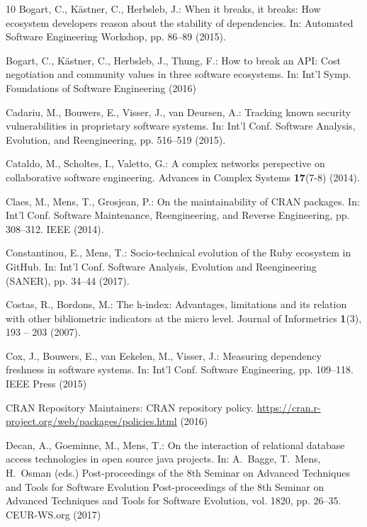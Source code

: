 \documentclass[smallextended]{svjour3}       %
\begin{document}
\begin{thebibliography}{10}
Bogart, C., {K\"astner}, C., Herbsleb, J.: When it breaks, it breaks: How
  ecosystem developers reason about the stability of dependencies.
\newblock In: Automated Software Engineering Workshop, pp. 86--89 (2015).
\newblock {}

Bogart, C., K\"astner, C., Herbsleb, J., Thung, F.: How to break an {API}: Cost
  negotiation and community values in three software ecosystems.
\newblock In: Int'l Symp. Foundations of Software Engineering (2016)

Cadariu, M., Bouwers, E., Visser, J., van Deursen, A.: Tracking known security
  vulnerabilities in proprietary software systems.
\newblock In: Int'l Conf. Software Analysis, Evolution, and Reengineering, pp.
  516--519 (2015).
\newblock {}

Cataldo, M., Scholtes, I., Valetto, G.: A complex networks perspective on
  collaborative software engineering.
\newblock Advances in Complex Systems \textbf{17}(7-8) (2014).
\newblock {}

Claes, M., Mens, T., Grosjean, P.: On the maintainability of {CRAN} packages.
\newblock In: Int'l Conf. Software Maintenance, Reengineering, and Reverse
  Engineering, pp. 308--312. {IEEE} (2014).
\newblock {}

Constantinou, E., Mens, T.: Socio-technical evolution of the {Ruby} ecosystem
  in {GitHub}.
\newblock In: Int'l Conf. Software Analysis, Evolution and Reengineering
  ({SANER}), pp. 34--44 (2017).
\newblock {}

Costas, R., Bordons, M.: The h-index: Advantages, limitations and its relation
  with other bibliometric indicators at the micro level.
\newblock Journal of Informetrics \textbf{1}(3), 193 -- 203 (2007).
\newblock {}

Cox, J., Bouwers, E., van Eekelen, M., Visser, J.: Measuring dependency
  freshness in software systems.
\newblock In: Int'l Conf. Software Engineering, pp. 109--118. IEEE Press (2015)

{CRAN Repository Maintainers}: {CRAN} repository policy.
\newblock \url{https://cran.r-project.org/web/packages/policies.html} (2016)

Decan, A., Goeminne, M., Mens, T.: On the interaction of relational database
  access technologies in open source java projects.
\newblock In: A.~Bagge, T.~Mens, H.~Osman (eds.) Post-proceedings of the 8th
  Seminar on Advanced Techniques and Tools for Software Evolution
  Post-proceedings of the 8th Seminar on Advanced Techniques and Tools for
  Software Evolution, vol. 1820, pp. 26--35. CEUR-WS.org (2017)


\end{thebibliography}
\end{document}
